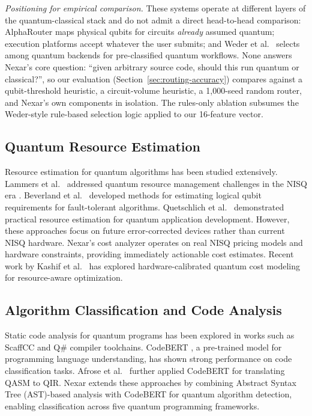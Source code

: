 \documentclass[10pt,conference]{IEEEtran}
\begin{document}
\emph{Positioning for empirical comparison.} These systems operate at different layers of the quantum-classical stack and do not admit a direct head-to-head comparison: AlphaRouter \cite{tang2024} maps physical qubits for circuits \emph{already} assumed quantum; execution platforms \cite{ibm2023,aws2023,microsoft2023} accept whatever the user submits; and Weder et al.\ \cite{weder2021} selects among quantum backends for pre-classified quantum workflows. None answers Nexar's core question: ``given arbitrary source code, should this run quantum or classical?'', so our evaluation (Section~\ref{sec:routing-accuracy}) compares against a qubit-threshold heuristic, a circuit-volume heuristic, a 1{,}000-seed random router, and Nexar's own components in isolation. The rules-only ablation subsumes the Weder-style rule-based selection logic applied to our 16-feature vector.

\subsection{Quantum Resource Estimation}

Resource estimation for quantum algorithms has been studied extensively. Lammers et al.\ \cite{lammers2025} addressed quantum resource management challenges in the NISQ era \cite{hai2025}. Beverland et al.\ \cite{beverland2022} developed methods for estimating logical qubit requirements for fault-tolerant algorithms. Quetschlich et al.\ \cite{quetschlich2024} demonstrated practical resource estimation for quantum application development. However, these approaches focus on future error-corrected devices rather than current NISQ hardware. Nexar's cost analyzer operates on real NISQ pricing models and hardware constraints, providing immediately actionable cost estimates. Recent work by Kashif et al.\ \cite{kashif2026} has explored hardware-calibrated quantum cost modeling for resource-aware optimization.

\subsection{Algorithm Classification and Code Analysis}

Static code analysis for quantum programs has been explored in works such as ScaffCC \cite{javadiabhari2015} and Q\# compiler toolchains. CodeBERT \cite{feng2020}, a pre-trained model for programming language understanding, has shown strong performance on code classification tasks. Afrose et al.\ \cite{afrose2025} further applied CodeBERT for translating QASM to QIR. Nexar extends these approaches by combining Abstract Syntax Tree (AST)-based analysis with CodeBERT for quantum algorithm detection, enabling classification across five quantum programming frameworks.
\end{document}
